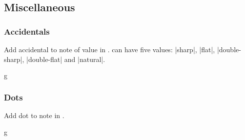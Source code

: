 \subsection{Miscellaneous}\label{sec:music-notes:misc}
\subsubsection{Accidentals}\label{sec:music-notes:misc:accidentals}
\begin{command}{\tmappendaccidental{}}
  Add accidental  to note of value  in 
  .  can have five values: |sharp|, |flat|, 
  |double-sharp|, |double-flat| and |natural|.
\end{command}
\begin{codeexample}[]
\begin{tmline}%
\begin{tmstaff}{g}{}
\end{tmstaff}%
\end{tmline}
\end{codeexample}
\subsubsection{Dots}\label{sec:music-notes:misc:dots}
\begin{command}{\tmadddot{}}
  Add  dot to note in . 
\end{command}
\begin{codeexample}[]
\begin{tmline}%
\begin{tmstaff}{g}{}
\end{tmstaff}%
\end{tmline}
\end{codeexample}
